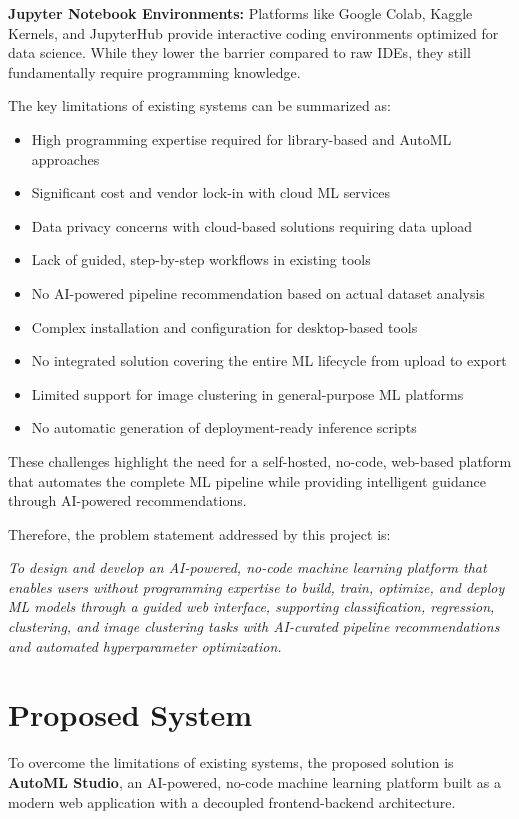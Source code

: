 \documentclass[12pt,a4paper]{report}
\begin{document}
\textbf{Jupyter Notebook Environments:} Platforms like Google Colab, Kaggle Kernels, and JupyterHub provide interactive coding environments optimized for data science. While they lower the barrier compared to raw IDEs, they still fundamentally require programming knowledge.

\newpage
The key limitations of existing systems can be summarized as:
\begin{itemize}
\item High programming expertise required for library-based and AutoML approaches
\item Significant cost and vendor lock-in with cloud ML services
\item Data privacy concerns with cloud-based solutions requiring data upload
\item Lack of guided, step-by-step workflows in existing tools
\item No AI-powered pipeline recommendation based on actual dataset analysis
\item Complex installation and configuration for desktop-based tools
\item No integrated solution covering the entire ML lifecycle from upload to export
\item Limited support for image clustering in general-purpose ML platforms
\item No automatic generation of deployment-ready inference scripts
\end{itemize}
These challenges highlight the need for a self-hosted, no-code, web-based platform that automates the complete ML pipeline while providing intelligent guidance through AI-powered recommendations.

Therefore, the problem statement addressed by this project is:

\textit{To design and develop an AI-powered, no-code machine learning platform that enables users without programming expertise to build, train, optimize, and deploy ML models through a guided web interface, supporting classification, regression, clustering, and image clustering tasks with AI-curated pipeline recommendations and automated hyperparameter optimization.}

\section{Proposed System}
To overcome the limitations of existing systems, the proposed solution is \textbf{AutoML Studio}, an AI-powered, no-code machine learning platform built as a modern web application with a decoupled frontend-backend architecture.
\end{document}
